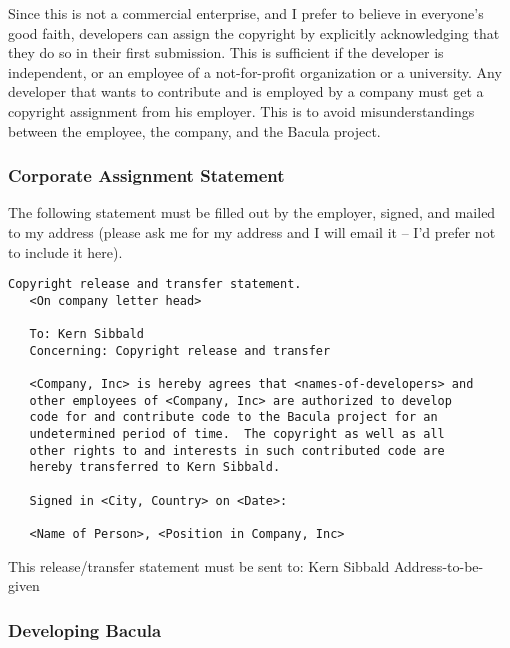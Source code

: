 Since this is not a commercial enterprise, and I prefer to believe in
everyone's good faith, developers can assign the copyright by explicitly
acknowledging that they do so in their first submission. This is sufficient if
the developer is independent, or an employee of a not-for-profit organization
or a university. Any developer that wants to contribute and is employed by a
company must get a copyright assignment from his employer. This is to avoid
misunderstandings between the employee, the company, and the Bacula project. 

\subsubsection*{Corporate Assignment Statement}

The following statement must be filled out by the employer, signed, and mailed
to my address (please ask me for my address and I will email it -- I'd prefer
not to include it here). 

\footnotesize
\begin{verbatim}
Copyright release and transfer statement.
   <On company letter head>

   To: Kern Sibbald
   Concerning: Copyright release and transfer

   <Company, Inc> is hereby agrees that <names-of-developers> and
   other employees of <Company, Inc> are authorized to develop
   code for and contribute code to the Bacula project for an
   undetermined period of time.  The copyright as well as all
   other rights to and interests in such contributed code are
   hereby transferred to Kern Sibbald.

   Signed in <City, Country> on <Date>:

   <Name of Person>, <Position in Company, Inc>

\end{verbatim}
\normalsize

This release/transfer statement must be sent to:
Kern Sibbald
Address-to-be-given

\subsubsection*{Developing Bacula}

